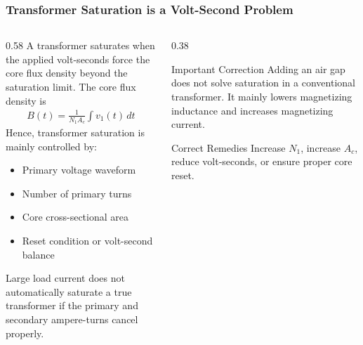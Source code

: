 \begin{frame}
    \frametitle{Transformer Saturation is a Volt-Second Problem}

    \begin{columns}
        \begin{column}{0.58\textwidth}
            A transformer saturates when the applied volt-seconds force the core flux density beyond the saturation limit. The core flux density is
            \begin{align}
                B(t)=\frac{1}{N_1A_c}\int v_1(t)\,dt
            \end{align}
            Hence, transformer saturation is mainly controlled by:
            \begin{itemize}
                \item Primary voltage waveform
                \item Number of primary turns
                \item Core cross-sectional area
                \item Reset condition or volt-second balance
            \end{itemize}
            Large load current does not automatically saturate a true transformer if the primary and secondary ampere-turns cancel properly.
        \end{column}

        \begin{column}{0.38\textwidth}
            \begin{block}{Important Correction}
                \small
                Adding an air gap does not solve saturation in a conventional transformer. It mainly lowers magnetizing inductance and increases magnetizing current.
            \end{block}

            \vspace{0.15cm}

            \begin{block}{Correct Remedies}
                \small
                Increase $N_1$, increase $A_c$, reduce volt-seconds, or ensure proper core reset.
            \end{block}
        \end{column}
    \end{columns}
\end{frame}


